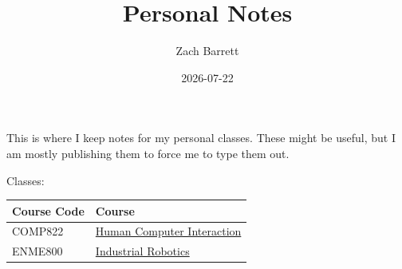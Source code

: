 \documentclass[
  letterpaper,
  DIV=11,
  numbers=noendperiod]{scrartcl}
\title{Personal Notes}
\author{Zach Barrett}
\date{2026-07-22}
\newcounter{none} %
\renewcommand*\contentsname{Table of contents}
\newcommand\contentsname{Table of contents}
\begin{document}
\maketitle

\renewcommand*\contentsname{Table of contents}
{
\setcounter{tocdepth}{3}
\tableofcontents
}

This is where I keep notes for my personal classes. These might be
useful, but I am mostly publishing them to force me to type them out.

Classes:

{\def\LTcaptype{none} %
\begin{longtable}[]{@{}
  >{\raggedright\arraybackslash}p{}
  >{\raggedright\arraybackslash}p{}@{}}
\toprule\noalign{}
\begin{minipage}[b]{\linewidth}\raggedright
Course Code
\end{minipage} & \begin{minipage}[b]{\linewidth}\raggedright
Course
\end{minipage} \\
\midrule\noalign{}
\endhead
\bottomrule\noalign{}
\endlastfoot
COMP822 & \href{./human-computer-interaction/COMP822-HCI.qmd}{Human
Computer Interaction} \\
ENME800 &
\href{./industrial-robotics/industrial-robotics.qmd}{Industrial
Robotics} \\
\end{longtable}
}
\end{document}
